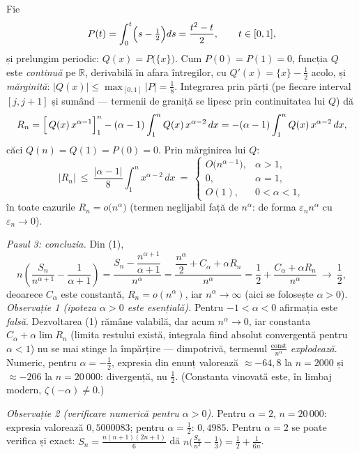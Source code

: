 Fie
\[ P(t)=\int_{0}^{t}\Bigl(s-\tfrac12\Bigr)ds=\frac{t^{2}-t}{2},\qquad t\in[0,1] , \]
și prelungim periodic: $Q(x)=P\bigl(\{x\}\bigr)$. Cum $P(0)=P(1)=0$, funcția $Q$ este \emph{continuă} pe $\mathbb{R}$, derivabilă în afara întregilor, cu $Q'(x)=\{x\}-\frac12$ acolo, și \emph{mărginită}: $|Q(x)|\le\max_{[0,1]}|P|=\frac18$. Integrarea prin părți (pe fiecare interval $[j,j+1]$ și sumând --- termenii de graniță se lipesc prin continuitatea lui $Q$) dă
\[ R_{n}=\Bigl[\,Q(x)\,x^{\alpha-1}\Bigr]_{1}^{n}-(\alpha-1)\int_{1}^{n}Q(x)\,x^{\alpha-2}\,dx=-(\alpha-1)\int_{1}^{n}Q(x)\,x^{\alpha-2}\,dx , \]
căci $Q(n)=Q(1)=P(0)=0$. Prin mărginirea lui $Q$:
\[ |R_{n}|\ \le\ \frac{|\alpha-1|}{8}\int_{1}^{n}x^{\alpha-2}\,dx\ =\ \begin{cases}O\bigl(n^{\alpha-1}\bigr), & \alpha>1,\\[2pt] 0, & \alpha=1,\\[2pt] O(1), & 0<\alpha<1,\end{cases} \]
în toate cazurile $R_{n}=o\bigl(n^{\alpha}\bigr)$ (termen neglijabil față de $n^{\alpha}$: de forma $\varepsilon_{n}n^{\alpha}$ cu $\varepsilon_{n}\to0$).

\emph{Pasul 3: concluzia.} Din (1),
\[ n\left(\frac{S_{n}}{n^{\alpha+1}}-\frac{1}{\alpha+1}\right)=\frac{S_{n}-\dfrac{n^{\alpha+1}}{\alpha+1}}{n^{\alpha}}=\frac{\dfrac{n^{\alpha}}{2}+C_{\alpha}+\alpha R_{n}}{n^{\alpha}}=\frac12+\frac{C_{\alpha}+\alpha R_{n}}{n^{\alpha}}\ \longrightarrow\ \frac12 , \]
deoarece $C_{\alpha}$ este constantă, $R_{n}=o(n^{\alpha})$, iar $n^{\alpha}\to\infty$ (aici se folosește $\alpha>0$).\\[2pt]
\emph{Observație 1 (ipoteza $\alpha>0$ este esențială).} Pentru $-1<\alpha<0$ afirmația este \emph{falsă}. Dezvoltarea (1) rămâne valabilă, dar acum $n^{\alpha}\to0$, iar constanta $C_{\alpha}+\alpha\lim R_{n}$ (limita restului există, integrala fiind absolut convergentă pentru $\alpha<1$) nu se mai stinge la împărțire --- dimpotrivă, termenul $\frac{\text{const}}{n^{\alpha}}$ \emph{explodează}. Numeric, pentru $\alpha=-\frac12$, expresia din enunț valorează $\approx-64{,}8$ la $n=2000$ și $\approx-206$ la $n=20\,000$: divergență, nu $\frac12$. (Constanta vinovată este, în limbaj modern, $\zeta(-\alpha)\neq0$.)

\emph{Observație 2 (verificare numerică pentru $\alpha>0$).} Pentru $\alpha=2$, $n=20\,000$: expresia valorează $0{,}5000083$; pentru $\alpha=\frac12$: $0{,}4985$. Pentru $\alpha=2$ se poate verifica și exact: $S_{n}=\frac{n(n+1)(2n+1)}{6}$ dă $n\bigl(\frac{S_n}{n^3}-\frac13\bigr)=\frac12+\frac{1}{6n}$.


